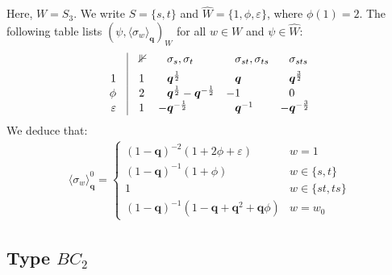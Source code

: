 \documentclass[a4paper,10pt,leqno]{amsart}
\theoremstyle{plain}
\theoremstyle{plain}
\theoremstyle{plain}
\theoremstyle{definition}
\theoremstyle{remark}
\newcommand{\Q}{\bm{q}}
\newcommand{\Tr}[1]{\langle{#1}\rangle_{\Q}}
\begin{document}
Here, $W = S_3$.
We write $S = \{s, t\}$ and $\hat{W} = \{1, \phi, \varepsilon\}$, where $\phi(1) = 2$.
The following table lists $(\psi, \Tr{\sigma_w})_W$ for all $w \in W$ and $\psi \in \hat{W}$:
\begin{align}
\begin{array}{r@{\quad}|@{\quad}l@{}ll@{}ll@{}ll@{}l}
	&&\bb{1}
	&&\sigma_s, \sigma_t
	&&\sigma_{st}, \sigma_{ts}
	&&\sigma_{sts}\\[1ex]
1
	&&1
	&&\Q^{\frac{1}{2}}
	&&\Q
	&&\Q^{\frac{3}{2}}\\
\phi
	&&2
	&&\Q^{\frac{1}{2}} - \Q^{-\frac{1}{2}}
	&-&1
	&&0\\
\varepsilon
	&&1
	&-&\Q^{-\frac{1}{2}}
	&&\Q^{-1}
	&-&\Q^{-\frac{3}{2}}
\end{array}
\end{align}
We deduce that:
\begin{align}
\Tr{\sigma_w}^0
=	\left\{\begin{array}{ll}
(1 - \Q)^{-2}(1 + 2\phi + \varepsilon)
	&w = 1\\
(1 - \Q)^{-1}(1 + \phi)
	&w \in \{s, t\}\\
1
	&w \in \{st, ts\}\\
(1 - \Q)^{-1}(1 - \Q + \Q^2 + \Q\phi)
	&w = w_0
\end{array}\right.
\end{align}

\subsection*{Type $BC_2$}
\end{document}
